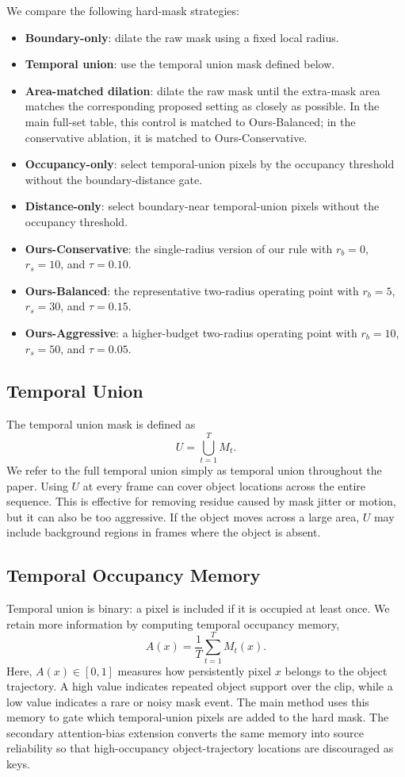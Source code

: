 \documentclass[nouppercase]{kaia}
\begin{document}
We compare the following hard-mask strategies:
\begin{itemize}
    \item \textbf{Boundary-only}: dilate the raw mask using a fixed local radius.
    \item \textbf{Temporal union}: use the temporal union mask defined below.
    \item \textbf{Area-matched dilation}: dilate the raw mask until the extra-mask area matches the corresponding proposed setting as closely as possible. In the main full-set table, this control is matched to Ours-Balanced; in the conservative ablation, it is matched to Ours-Conservative.
    \item \textbf{Occupancy-only}: select temporal-union pixels by the occupancy threshold without the boundary-distance gate.
    \item \textbf{Distance-only}: select boundary-near temporal-union pixels without the occupancy threshold.
    \item \textbf{Ours-Conservative}: the single-radius version of our rule with $r_b=0$, $r_s=10$, and $\tau=0.10$.
    \item \textbf{Ours-Balanced}: the representative two-radius operating point with $r_b=5$, $r_s=30$, and $\tau=0.15$.
    \item \textbf{Ours-Aggressive}: a higher-budget two-radius operating point with $r_b=10$, $r_s=50$, and $\tau=0.05$.
\end{itemize}

\subsection{Temporal Union}
The temporal union mask is defined as
\begin{equation}
    U = \bigcup_{t=1}^{T} M_t.
\end{equation}
We refer to the full temporal union simply as temporal union throughout the paper. Using $U$ at every frame can cover object locations across the entire sequence. This is effective for removing residue caused by mask jitter or motion, but it can also be too aggressive. If the object moves across a large area, $U$ may include background regions in frames where the object is absent.

\subsection{Temporal Occupancy Memory}
Temporal union is binary: a pixel is included if it is occupied at least once. We retain more information by computing temporal occupancy memory,
\begin{equation}
    A(x) = \frac{1}{T}\sum_{t=1}^{T} M_t(x).
\end{equation}
Here, $A(x) \in [0,1]$ measures how persistently pixel $x$ belongs to the object trajectory. A high value indicates repeated object support over the clip, while a low value indicates a rare or noisy mask event. The main method uses this memory to gate which temporal-union pixels are added to the hard mask. The secondary attention-bias extension converts the same memory into source reliability so that high-occupancy object-trajectory locations are discouraged as keys.
\end{document}
